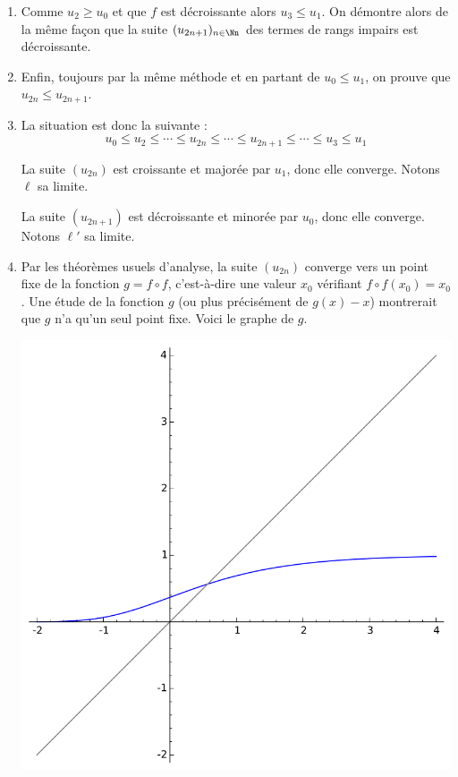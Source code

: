 \documentclass[class=report,crop=false]{standalone}
\begin{document}
\begin{enumerate}
\begin{enumerate}
  \item Comme $u_2 \ge u_0$ et que $f$ est décroissante alors $u_3 \le u_1$.
  On démontre alors de la même façon que la suite 
  $(u_{2n+1})_{n\in\Nn}$ des termes de rangs impairs est décroissante.
  
  \item Enfin, toujours par la même méthode et en partant de
  $u_0 \le u_1$, on prouve que $u_{2n} \le u_{2n+1}$.
  
  \item La situation est donc la suivante :
  $$u_0 \le u_2 \le \cdots \le u_{2n} \le \cdots \le u_{2n+1} \le \cdots \le u_3 \le u_1$$
  
  La suite $(u_{2n})$ est croissante et majorée par $u_1$, donc elle converge. Notons $\ell$
  sa limite.
  
  La suite $(u_{2n+1})$ est décroissante et minorée par $u_0$, donc elle converge. Notons $\ell'$
  sa limite.
  
  \item Par les théorèmes usuels d'analyse, la suite $(u_{2n})$
  converge vers un point fixe de la fonction $g=f \circ f$, 
  c'est-à-dire une valeur $x_0$ vérifiant $f\circ f(x_0)=x_0$.
  Une étude de la fonction $g$ (ou plus précisément de $g(x)-x$) montrerait que $g$
  n'a qu'un seul point fixe. Voici le graphe de $g$.
  \begin{center}
\includegraphics[scale=0.4]{figures/suites-visual2}
\end{center} 


\end{enumerate}
\end{enumerate}
\end{document}
